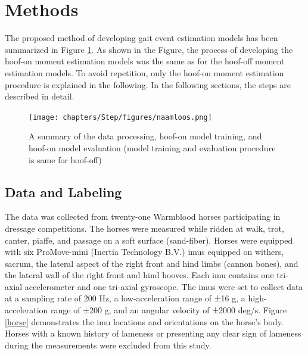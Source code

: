 \section{Methods}
\label{sec:methods}


The proposed method of developing gait event estimation models has been summarized in Figure \ref{system_step}. As shown in the Figure, the process of developing the hoof-on moment estimation models was the same as for the hoof-off moment estimation models. To avoid repetition, only the hoof-on moment estimation procedure is explained in the following. In the following sections, the steps are described in detail.


\begin{figure}[!tbp]
\centering
\texttt{[image: chapters/Step/figures/naamloos.png]}
\caption{A summary of the data processing, hoof-on model training, and hoof-on model evaluation (model training and evaluation procedure is same for hoof-off)}
\label{system_step}
\end{figure}

\subsection{Data and Labeling}

The data was collected from twenty-one Warmblood horses participating in dressage competitions. The horses were measured while ridden at walk, trot, canter, piaffe, and passage on a soft surface (sand-fiber). Horses were equipped with six ProMove-mini (Inertia Technology B.V.) \gls{imu}s \cite{456} equipped on withers, sacrum, the lateral aspect of the right front and hind limbs (cannon bones), and the lateral wall of the right front and hind hooves. Each \gls{imu} contains one tri-axial accelerometer and one tri-axial gyroscope. The \gls{imu}s were set to collect data at a sampling rate of 200 Hz, a low-acceleration range of  ±16 g, a high-acceleration range of ±200 g, and an angular velocity of ±2000 deg/s. Figure \ref{horse} demonstrates the \gls{imu} locations and orientations on the horse's body. Horses with a known history of lameness or presenting any clear sign of lameness during the measurements were excluded from this study.

